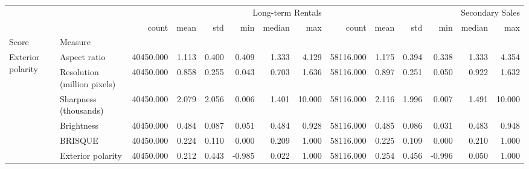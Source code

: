 \begin{tabular}{llrrrrrrrrrrrr}
\toprule
 &  & \multicolumn{6}{r}{Long-term Rentals} & \multicolumn{6}{r}{Secondary Sales} \\
 &  & count & mean & std & min & median & max & count & mean & std & min & median & max \\
Score & Measure &  &  &  &  &  &  &  &  &  &  &  &  \\
\midrule
\multirow[t]{6}{*}{Exterior polarity} & Aspect ratio & 40450.000 & 1.113 & 0.400 & 0.409 & 1.333 & 4.129 & 58116.000 & 1.175 & 0.394 & 0.338 & 1.333 & 4.354 \\
 & Resolution (million pixels) & 40450.000 & 0.858 & 0.255 & 0.043 & 0.703 & 1.636 & 58116.000 & 0.897 & 0.251 & 0.050 & 0.922 & 1.632 \\
 & Sharpness (thousands) & 40450.000 & 2.079 & 2.056 & 0.006 & 1.401 & 10.000 & 58116.000 & 2.116 & 1.996 & 0.007 & 1.491 & 10.000 \\
 & Brightness & 40450.000 & 0.484 & 0.087 & 0.051 & 0.484 & 0.928 & 58116.000 & 0.485 & 0.086 & 0.031 & 0.483 & 0.948 \\
 & BRISQUE & 40450.000 & 0.224 & 0.110 & 0.000 & 0.209 & 1.000 & 58116.000 & 0.225 & 0.109 & 0.000 & 0.210 & 1.000 \\
 & Exterior polarity & 40450.000 & 0.212 & 0.443 & -0.985 & 0.022 & 1.000 & 58116.000 & 0.254 & 0.456 & -0.996 & 0.050 & 1.000 \\
\cline{1-14}
\bottomrule
\end{tabular}
